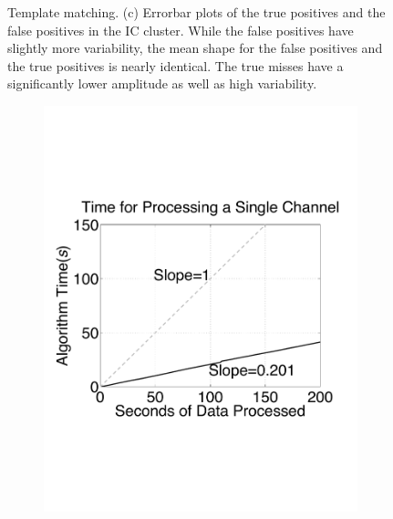 \begin{center}
\begin{figure}[h!]
\begin{subfigure}[b]{.33\textwidth}
\caption{}
\label{truewaveforms}
\end{subfigure}
\caption{Template matching.
(c) Errorbar plots of the true positives and the false positives in the IC cluster.  While the false positives have slightly more variability, the mean shape for the false positives and the true positives is nearly identical.  The true misses have a significantly lower amplitude as well as high variability. 
} \label{fig:IC-PCA}
\end{figure}
\end{center}





\begin{center}
\begin{figure}[h!]
\begin{subfigure}[b]{.5\textwidth}
\includegraphics[width=\textwidth]{../figs/new/timingsinglechannel.pdf}
\caption{}
\label{fig:ICold}
\end{subfigure}
\begin{subfigure}[b]{.5\textwidth}
\caption{}
\label{fig:ICold}
\end{subfigure}
\caption{ 
} \label{fig:timing}
\end{figure}
\end{center}


